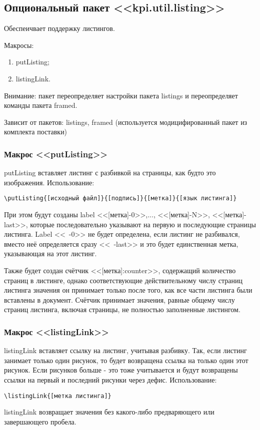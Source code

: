 \subsection{Опциональный пакет <<kpi.util.listing>>}
Обеспеичвает поддержку листингов.\par
Макросы:
\begin{enumerate}
\item putListing;
\item listingLink.
\end{enumerate}\par
Внимание: пакет переопределяет настройки пакета listings и переопределяет команды пакета framed.\par
Зависит от пакетов: listings, framed (используется модицифированный пакет из комплекта поставки)
\subsubsection{Макрос <<putListing>>}
putListing вставляет листинг с разбивкой на страницы, как будто это изображения.
Использование:{\small
\begin{Verbatim}
\putListing{[исходный файл]}{[подпись]}{[метка]}{[язык листинга]}
\end{Verbatim}}
\normalsize
При этом будут созданы label <<[метка]-0>>,..., <<[метка]-N>>, <<[метка]-last>>, которые последовательно указывают на первую и последующие страницы листинга. Label <<~-0>> не будет определена, если листинг не разбивался, вместо неё определяется сразу <<~-last>> и это будет единственная метка, указывающая на этот листинг.\par
Также будет создан счётчик <<[метка]:counter>>, содержащий количество страниц в листинге, однако соответствующие действительному числу страниц листинга значения он принимает только после того, как все части листинга были вставлены в документ. Счётчик принимает значения, равные общему числу страниц листинга, включая страницы, не полностью заполненные листингом.

\subsubsection{Макрос <<listingLink>>}
listingLink вставляет ссылку на листинг, учитывая разбивку. Так, если листинг занимает только один рисунок, то будет возвращена ссылка на только один этот рисунок. Если рисунков больше - это тоже учитывается и будут возвращены ссылки на первый и последний рисунки через дефис.
Использование:{\small
\begin{Verbatim}
\listingLink{[метка листинга]}
\end{Verbatim}}
\normalsize
listingLink возвращает значения без какого-либо предваряющего или завершающего пробела.


